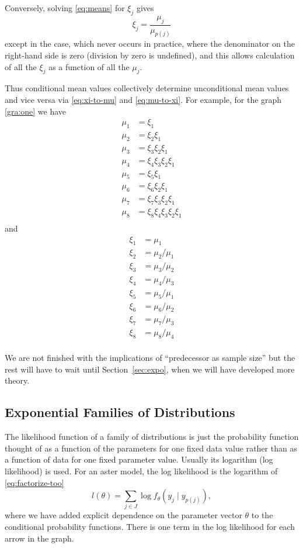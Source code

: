 \documentclass[11pt]{article}
\begin{document}
Conversely, solving \eqref{eq:means} for $\xi_j$ gives
\begin{equation} \label{eq:mu-to-xi}
   \xi_j = \frac{\mu_j}{\mu_{p(j)}}
\end{equation}
except in the case, which never occurs in practice,
where the denominator on the right-hand side is zero
(division by zero is undefined), and this allows
calculation of all the $\xi_j$ as a function of all the $\mu_j$.

Thus conditional mean values collectively determine unconditional mean values
and vice versa via \eqref{eq:xi-to-mu} and \eqref{eq:mu-to-xi}.
For example, for the graph \eqref{gra:one} we have
\begin{align*}
    \mu_1 & = \xi_1 \\
    \mu_2 & = \xi_2 \xi_1 \\
    \mu_3 & = \xi_3 \xi_2 \xi_1 \\
    \mu_4 & = \xi_4 \xi_3 \xi_2 \xi_1 \\
    \mu_5 & = \xi_5 \xi_1 \\
    \mu_6 & = \xi_6 \xi_2 \xi_1 \\
    \mu_7 & = \xi_7 \xi_3 \xi_2 \xi_1 \\
    \mu_8 & = \xi_8 \xi_4 \xi_3 \xi_2 \xi_1 \\
\end{align*}
and
\begin{align*}
    \xi_1 & = \mu_1 \\
    \xi_2 & = \mu_2 / \mu_1 \\
    \xi_3 & = \mu_3 / \mu_2 \\
    \xi_4 & = \mu_4 / \mu_3 \\
    \xi_5 & = \mu_5 / \mu_1 \\
    \xi_6 & = \mu_6 / \mu_2 \\
    \xi_7 & = \mu_7 / \mu_3 \\
    \xi_8 & = \mu_8 / \mu_4 \\
\end{align*}

We are not finished with the implications of ``predecessor as sample size''
but the rest will have to wait until Section~\ref{sec:expo},
when we will have developed more theory.

\subsection{Exponential Families of Distributions} \label{sec:expo-general}

The likelihood function of a family of distributions is just the probability
function thought of as a function of the parameters for one fixed data value
rather than as a function of data for one fixed parameter value.  Usually
its logarithm (log likelihood) is used.  For an aster model, the log likelihood
is the logarithm of \eqref{eq:factorize-too}
\begin{equation} \label{eq:aster-logl}
   l(\theta) = \sum_{j \in J} \log f_\theta(y_j \mid y_{p(j)}),
\end{equation}
where we have added explicit dependence on the parameter vector $\theta$
to the conditional probability functions.  There is one term in the
log likelihood for each arrow in the graph.
\end{document}
